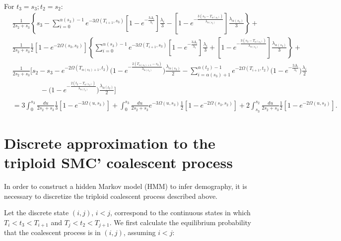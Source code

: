 \documentclass{article}
\begin{document}
For $t_3=s_3; t_2=s_2$:
\begin{align*}
    &\frac{1}{2s_2+s_3}
    \left\{s_3 - \sum_{i=0}^{\alpha(s_3)-1}e^{-3\Omega(T_{i+1},s_3)}
        \left[1-e^{-\frac{3\Delta_i}{\lambda_i}}\right]\frac{\lambda_i}{3}-
    \left[1-e^{-\frac{3\left(s_3-T_{\alpha(s_3)}\right)}{\lambda_{\alpha(s_3)}}}\right]
        \frac{\lambda_{\alpha(s_3)}}{3}\right\}+\\
    &\frac{1}{2s_2+s_3}\frac{1}{2}\left[1-e^{-2\Omega(s_3,s_2)}\right]
    \left\{\sum_{i=0}^{\alpha(s_3)-1}e^{-3\Omega(T_{i+1},s_3)}
        \left[1-e^{-\frac{3\Delta_i}{\lambda_i}}\right]\frac{\lambda_i}{3}+
    \left[1-e^{-\frac{3\left(s_3-T_{\alpha(s_3)}\right)}{\lambda_{\alpha(s_3)}}}\right]
        \frac{\lambda_{\alpha(s_3)}}{3}\right\}+\\
        &\frac{1}{2s_2+s_3}\Bigg[s_2-s_3-e^{-2\Omega(T_{\alpha(s_3)+1},t_2)}\Bigg(1-e^{-\frac{2\left(T_{\alpha(s_3)+1}-s_3\right)}{\lambda_{\alpha(s_3)}}}\Bigg)\frac{\lambda_{\alpha(s_3)}}{2}-\sum_{i=\alpha(s_3)+1}^{\alpha(t_2)-1}e^{-2\Omega\left(T_{i+1},t_2\right)}\Bigg(1-e^{-\frac{2\Delta_i}{\lambda_i}}\Bigg)\frac{\lambda_i}{2}\\
    &\qquad\qquad-\Bigg(1-e^{-\frac{2\left(t_2-T_{\alpha(t_2)}\right)}{\lambda_{\alpha(t_2)}}}\Bigg)\frac{\lambda_{\alpha(t_2)}}{2}
    \Bigg]\\
    \\
    &=3\int_0^{s_3}\frac{du}{2s_2+s_3}\frac{1}{3}\left[1-e^{-3\Omega(u,s_3)}\right]+\int_0^{s_3}\frac{du}{2s_2+s_3}e^{-3\Omega(u,s_3)}\frac{1}{2}\left[1-e^{-2\Omega(s_3,s_2)}\right]+2\int_{s_3}^{s_2}\frac{du}{2s_2+s_3}\frac{1}{2}\left[1-e^{-2\Omega(u,s_2)}\right].
\end{align*}

\section{Discrete approximation to the triploid SMC' coalescent process}

In order to construct a hidden Markov model (HMM) to infer demography, it is
necessary to discretize the triploid coalescent process described above.

Let the discrete state $(i,j)$, $i<j$, correspond to the continuous states in which ${T_i
< t_3 < T_{i+1}}$ and ${T_j < t_2 < T_{j+1}}$. We first calculate the equilibrium
probability that the coalescent process is in $(i,j)$, assuming $i<j$:
\end{document}
